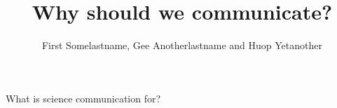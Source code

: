 \documentclass[a4paper,11pt]{article}
\title{Why should we communicate?}
\author[Somelastname,~F., Anotherlastname,~G.~and Yetanother,~H.]{First Somelastname, Gee Anotherlastname and Huop Yetanother}
\begin{document}
\maketitle\raggedbottom

What is science communication for?
\end{document}

